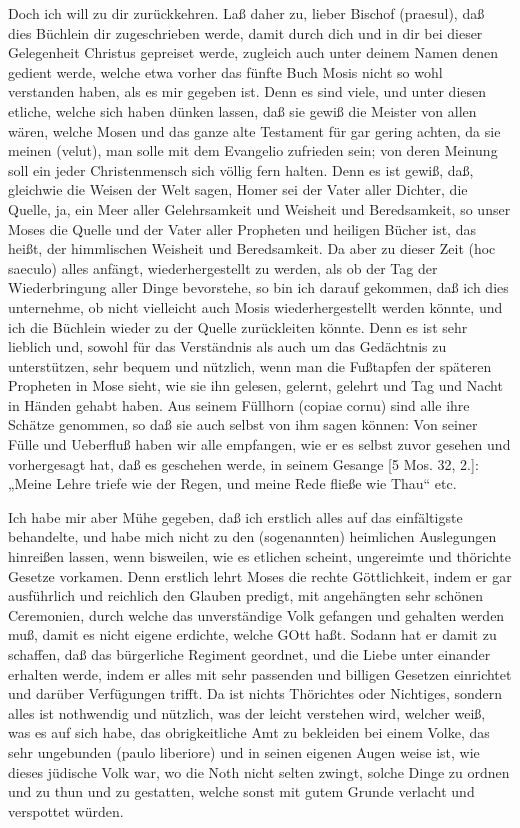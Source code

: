 Doch ich will zu dir zurückkehren. Laß daher zu, lieber Bischof (praesul), daß dies Büchlein dir zugeschrieben werde, damit durch dich und in dir bei dieser Gelegenheit Christus gepreiset werde, zugleich auch unter deinem Namen denen gedient werde, welche etwa vorher das fünfte Buch Mosis nicht so wohl verstanden haben, als es mir gegeben ist. Denn es sind viele, und unter diesen etliche, welche sich haben dünken lassen, daß sie gewiß die Meister von allen wären, welche Mosen und das ganze alte Testament für gar gering achten, da sie meinen (velut), man solle mit dem Evangelio zufrieden sein; von deren Meinung soll ein jeder Christenmensch sich völlig fern halten. Denn es ist gewiß, daß, gleichwie die Weisen der Welt sagen, Homer sei der Vater aller Dichter, die Quelle, ja, ein Meer aller Gelehrsamkeit und Weisheit und Beredsamkeit, so unser Moses die Quelle und der Vater aller Propheten und heiligen Bücher ist, das heißt, der himmlischen Weisheit und Beredsamkeit. Da aber zu dieser Zeit (hoc saeculo) alles anfängt, wiederhergestellt zu werden, als ob der Tag der Wiederbringung aller Dinge bevorstehe, so bin ich darauf gekommen, daß ich dies unternehme, ob nicht vielleicht auch Mosis wiederhergestellt werden könnte, und ich die Büchlein wieder zu der Quelle zurückleiten könnte. Denn es ist sehr lieblich und, sowohl für das Verständnis als auch um das Gedächtnis zu unterstützen, sehr bequem und nützlich, wenn man die Fußtapfen der späteren Propheten in Mose sieht, wie sie ihn gelesen, gelernt, gelehrt und Tag und Nacht in Händen gehabt haben. Aus seinem Füllhorn (copiae cornu) sind alle ihre Schätze genommen, so daß sie auch selbst von ihm sagen können: Von seiner Fülle und Ueberfluß haben wir alle empfangen, wie er es selbst zuvor gesehen und vorhergesagt hat, daß es geschehen werde, in seinem Gesange [5 Mos. 32, 2.]: „Meine Lehre triefe wie der Regen, und meine Rede fließe wie Thau“ etc.

Ich habe mir aber Mühe gegeben, daß ich erstlich alles auf das einfältigste behandelte, und habe mich nicht zu den (sogenannten) heimlichen Auslegungen hinreißen lassen, wenn bisweilen, wie es etlichen scheint, ungereimte und thörichte Gesetze vorkamen. Denn erstlich lehrt Moses die rechte Göttlichkeit, indem er gar ausführlich und reichlich den Glauben predigt, mit angehängten sehr schönen Ceremonien, durch welche das unverständige Volk gefangen und gehalten werden muß, damit es nicht eigene erdichte, welche GOtt haßt. Sodann hat er damit zu schaffen, daß das bürgerliche Regiment geordnet, und die Liebe unter einander erhalten werde, indem er alles mit sehr passenden und billigen Gesetzen einrichtet und darüber Verfügungen trifft. Da ist nichts Thörichtes oder Nichtiges, sondern alles ist nothwendig und nützlich, was der leicht verstehen wird, welcher weiß, was es auf sich habe, das obrigkeitliche Amt zu bekleiden bei einem Volke, das sehr ungebunden (paulo liberiore) und in seinen eigenen Augen weise ist, wie dieses jüdische Volk war, wo die Noth nicht selten zwingt, solche Dinge zu ordnen und zu thun und zu gestatten, welche sonst mit gutem Grunde verlacht und verspottet würden.

